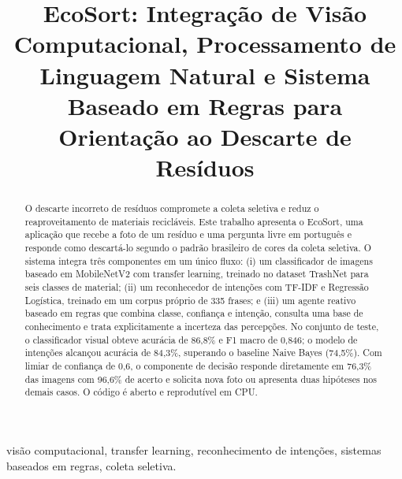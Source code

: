\documentclass[conference]{IEEEtran}
\begin{document}
\title{EcoSort: Integração de Visão Computacional, Processamento de Linguagem Natural e Sistema Baseado em Regras para Orientação ao Descarte de Resíduos}

\author{
}

\maketitle

\begin{abstract}
O descarte incorreto de resíduos compromete a coleta seletiva e reduz o reaproveitamento de materiais recicláveis. Este trabalho apresenta o EcoSort, uma aplicação que recebe a foto de um resíduo e uma pergunta livre em português e responde como descartá-lo segundo o padrão brasileiro de cores da coleta seletiva. O sistema integra três componentes em um único fluxo: (i) um classificador de imagens baseado em MobileNetV2 com transfer learning, treinado no dataset TrashNet para seis classes de material; (ii) um reconhecedor de intenções com TF-IDF e Regressão Logística, treinado em um corpus próprio de 335 frases; e (iii) um agente reativo baseado em regras que combina classe, confiança e intenção, consulta uma base de conhecimento e trata explicitamente a incerteza das percepções. No conjunto de teste, o classificador visual obteve acurácia de 86,8\% e F1 macro de 0,846; o modelo de intenções alcançou acurácia de 84,3\%, superando o baseline Naive Bayes (74,5\%). Com limiar de confiança de 0,6, o componente de decisão responde diretamente em 76,3\% das imagens com 96,6\% de acerto e solicita nova foto ou apresenta duas hipóteses nos demais casos. O código é aberto e reprodutível em CPU.
\end{abstract}

\begin{IEEEkeywords}
visão computacional, transfer learning, reconhecimento de intenções, sistemas baseados em regras, coleta seletiva.
\end{IEEEkeywords}

\end{document}
